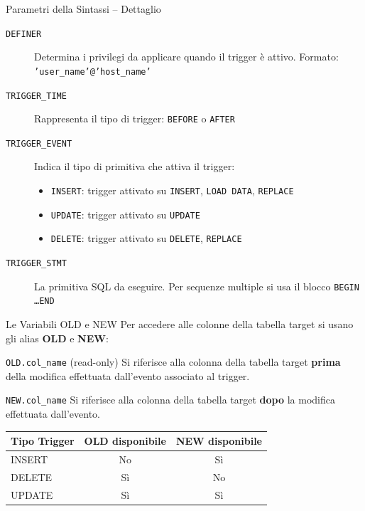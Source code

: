 \documentclass[aspectratio=169]{beamer}
\begin{document}
\begin{frame}[fragile]{Parametri della Sintassi -- Dettaglio}
  \begin{description}
    \item[\texttt{DEFINER}] Determina i privilegi da applicare quando il trigger
      è attivo. Formato: \texttt{'user\_name'@'host\_name'}
    \item[\texttt{TRIGGER\_TIME}] Rappresenta il tipo di trigger:
      \texttt{BEFORE} o \texttt{AFTER}
    \item[\texttt{TRIGGER\_EVENT}] Indica il tipo di primitiva che attiva il trigger:
      \begin{itemize}
        \item \texttt{INSERT}: trigger attivato su \texttt{INSERT}, \texttt{LOAD DATA},
          \texttt{REPLACE}
        \item \texttt{UPDATE}: trigger attivato su \texttt{UPDATE}
        \item \texttt{DELETE}: trigger attivato su \texttt{DELETE}, \texttt{REPLACE}
      \end{itemize}
    \item[\texttt{TRIGGER\_STMT}] La primitiva SQL da eseguire. Per sequenze
      multiple si usa il blocco \texttt{BEGIN \ldots END}
  \end{description}
\end{frame}

\begin{frame}[fragile]{Le Variabili OLD e NEW}
  Per accedere alle colonne della tabella target si usano gli alias \textbf{OLD}
  e \textbf{NEW}:
  \vspace{0.2cm}
  \begin{block}{\texttt{OLD.col\_name} (read-only)}
    Si riferisce alla colonna della tabella target \textbf{prima} della modifica
    effettuata dall'evento associato al trigger.
  \end{block}
  \vspace{0.2cm}
  \begin{alertblock}{\texttt{NEW.col\_name}}
    Si riferisce alla colonna della tabella target \textbf{dopo} la modifica
    effettuata dall'evento.
  \end{alertblock}
  \vspace{0.3cm}
  \begin{center}
    \renewcommand{\arraystretch}{1.2}
    \begin{tabular}{lcc}
      \toprule
      \textbf{Tipo Trigger} & \textbf{OLD disponibile} & \textbf{NEW disponibile} \\
      \midrule
      INSERT & No & Sì \\
      DELETE & Sì & No \\
      UPDATE & Sì & Sì \\
      \bottomrule
    \end{tabular}
  \end{center}
\end{frame}
\end{document}
